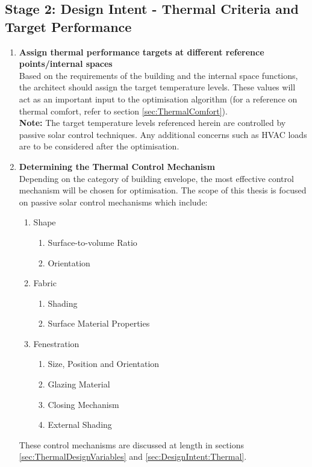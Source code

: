 \clearpage
\colorbox{95Gray}{%
	\begin{minipage}[c][20.5cm][t]{\textwidth}{%
		\subsection{Stage 2: Design Intent - Thermal Criteria and Target Performance}
		\label{sec:Stage2}
		\vspace{0.5cm}
		\begin{enumerate}
			\item \textbf{Assign thermal performance targets at different reference points/internal spaces}\\[3mm]
				Based on the requirements of the building and the internal space functions, the architect should assign the target temperature levels. These values will act as an important input to the optimisation algorithm (for a reference on thermal comfort, refer to section \ref{sec:ThermalComfort}).\\[3mm]
				\textbf{Note:} The target temperature levels referenced herein are controlled by passive solar control techniques. Any additional concerns such as HVAC loads are to be considered after the optimisation.
			\item \textbf{Determining the Thermal Control Mechanism}\\[3mm]
				Depending on the category of building envelope, the most effective control mechanism will be chosen for optimisation. The scope of this thesis is focused on passive solar control mechanisms which include:
				\begin{enumerate}
					\item Shape
						\begin{enumerate}
							\item Surface-to-volume Ratio
							\item Orientation
						\end{enumerate}
					\item Fabric
						\begin{enumerate}
							\item Shading
							\item Surface Material Properties
						\end{enumerate}
					\item Fenestration
						\begin{enumerate}
							\item Size, Position and Orientation
							\item Glazing Material
							\item Closing Mechanism
							\item External Shading
						\end{enumerate}
				\end{enumerate}
				These control mechanisms are discussed at length in sections \ref{sec:ThermalDesignVariables} and \ref{sec:DesignIntent:Thermal}.
		\end{enumerate}
	}%
\end{minipage}%
}


